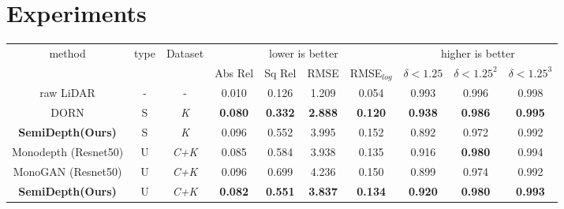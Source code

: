 \documentclass[letterpaper, 10 pt, conference]{ieeeconf}
\begin{document}
\section{Experiments} \label{sec:Experiments}
\begin{table*}
\centering
\begin{tabular}{|c||c||c||c|c|c|c||c|c|c|}
\hline
\multirow{2}{*}{method}                & \multirow{2}{*}{type}& \multirow{2}{*}{Dataset}&  \multicolumn{4}{c||}{lower is better}&\multicolumn{3}{c|}{higher is better}    \\ \cline{4-10} &                       &             &  Abs Rel    & Sq Rel      & RMSE        & RMSE$_{log}$  &$\delta < 1.25$ & $\delta<1.25^{2}$ & $\delta <1.25^{3}$    \\ \hline
raw LiDAR            &        -            &  -   &    0.010    &     0.126  &     1.209         &     0.054    &    0.993     &    0.996    &   0.998   \\ \hline
DORN\cite{fu2018deep}             &        S            &  \textit{K}   &   \textbf{0.080}    &     \textbf{0.332}  &     \textbf{2.888}   &     \textbf{0.120}   &    \textbf{0.938}     &    \textbf{0.986}    &   \textbf{0.995}   \\
\textbf{SemiDepth(Ours)}                                  &        S            &  \textit{K}   &     0.096        &    0.552         &       3.995      &         0.152    &       0.892      &      0.972       &     0.992     \\  \hline

Monodepth \cite{godard2017unsupervised}(Resnet50)&  U    &  \textit{C+K}  &   0.085     &    0.584   &  3.938      &     0.135   &       0.916 &   \textbf{0.980}   &   0.994  \\
MonoGAN \cite{aleotti2018generative}(Resnet50)&  U    &  \textit{C+K}  &   0.096     &    0.699   &  4.236      &     0.150   &       0.899 &    0.974   &   0.992  \\
\textbf{SemiDepth(Ours)}                                   &     U    &  \textit{C+K}  &    \textbf{0.082}   &     \textbf{0.551}  &  \textbf{3.837}      &     \textbf{0.134} & \textbf{0.920}    &     \textbf{0.980}   &  \textbf{0.993}   \\\hline


\end{tabular}
\end{table*}
\end{document}
